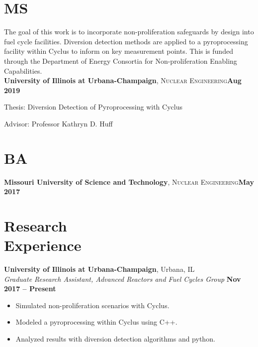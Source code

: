 \documentclass[margin,line]{resume}
\begin{document}
\begin{resume}
    \section{\mysidestyle MS}
    The goal of this work is to incorporate non-proliferation safeguards by design into fuel cycle facilities. Diversion detection methods are applied to a pyroprocessing facility
    within Cyclus to inform on key measurement points. This is funded through the
    Department of Energy Consortia for Non-proliferation Enabling Capabilities.\\
    \textbf{University of Illinois at Urbana-Champaign}, \textsc{Nuclear Engineering}\hfill \textbf{Aug 2019}\vspace{-3mm}\\\vspace{-1mm}%
    \begin{list2}
        \item Thesis: Diversion Detection of Pyroprocessing with Cyclus
        \item Advisor:  Professor Kathryn D. Huff
    \end{list2}\vspace{-1.5mm}
    \section{\mysidestyle BA}
    \textbf{Missouri University of Science and Technology}, \textsc{Nuclear Engineering}\hfill\textbf{May 2017}\vspace{-3mm}\\\vspace{-1mm}%
    \section{\mysidestyle Research\\Experience}
    \textbf{University of Illinois at Urbana-Champaign}, Urbana, IL\\
		\textsl{Graduate Research Assistant, Advanced Reactors and Fuel Cycles Group} \hfill \textbf{Nov 2017 -- Present}\\
		\begin{itemize}
			\item Simulated non-proliferation scenarios with Cyclus.
			\item Modeled a pyroprocessing within Cyclus using C++.
			\item Analyzed results with diversion detection algorithms and python.
		\end{itemize}


\end{resume}
\end{document}
